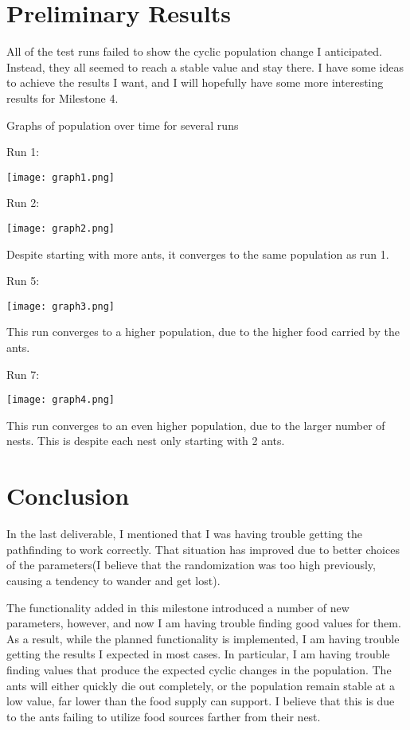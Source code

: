 \documentclass{article}
\begin{document}
\section{Preliminary Results}

All of the test runs failed to show the cyclic population change I anticipated.  Instead, they all seemed to reach a stable value and stay there.  I have some ideas to achieve the results I want, and I will hopefully have some more interesting results for Milestone 4.

Graphs of population over time for several runs

Run 1:

\texttt{[image: graph1.png]}

Run 2:

\texttt{[image: graph2.png]}

Despite starting with more ants, it converges to the same population as run 1.

Run 5:

\texttt{[image: graph3.png]}

This run converges to a higher population, due to the higher food carried by the ants.

Run 7:

\texttt{[image: graph4.png]}

This run converges to an even higher population, due to the larger number of nests.  This is despite each nest only starting with 2 ants.



\section{Conclusion}

In the last deliverable, I mentioned that I was having trouble getting the pathfinding to work correctly.  That situation has improved due to better choices of the parameters(I believe that the randomization was too high previously, causing a tendency to wander and get lost).

The functionality added in this milestone introduced a number of new parameters, however, and now I am having trouble finding good values for them.
As a result, while the planned functionality is implemented, I am having trouble getting the results I expected in most cases.  In particular, I am having trouble finding values that produce the expected cyclic changes in the population.  The ants will either quickly die out completely, or the population remain stable at a low value, far lower than the food supply can support.  I believe that this is due to the ants failing to utilize food sources farther from their nest.
\end{document}
